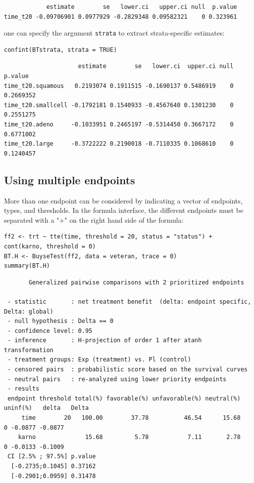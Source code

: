 \documentclass[12pt]{article}
\begin{document}
\begin{verbatim}
            estimate        se   lower.ci   upper.ci null  p.value
time_t20 -0.09706901 0.0977929 -0.2829348 0.09582321    0 0.323961
\end{verbatim}


one can specify the argument \texttt{strata} to extract strata-specific estimates:
\lstset{language=r,label= ,caption= ,captionpos=b,numbers=none}
\begin{lstlisting}
confint(BTstrata, strata = TRUE)
\end{lstlisting}

\begin{verbatim}
                     estimate        se   lower.ci  upper.ci null   p.value
time_t20.squamous   0.2193074 0.1911515 -0.1690137 0.5486919    0 0.2669352
time_t20.smallcell -0.1792181 0.1540933 -0.4567640 0.1301230    0 0.2551275
time_t20.adeno     -0.1033951 0.2465197 -0.5314450 0.3667172    0 0.6771002
time_t20.large     -0.3722222 0.2190018 -0.7110335 0.1068610    0 0.1240457
\end{verbatim}


\clearpage

\subsection{Using multiple endpoints}
\label{sec:org92293c4}
More than one endpoint can be considered by indicating a vector of
endpoints, types, and thresholds. In the formula interface, the
different endpoints must be separated with a "+" on the right hand
side of the formula:
\lstset{language=r,label= ,caption= ,captionpos=b,numbers=none}
\begin{lstlisting}
ff2 <- trt ~ tte(time, threshold = 20, status = "status") + cont(karno, threshold = 0)
BT.H <- BuyseTest(ff2, data = veteran, trace = 0)
summary(BT.H)
\end{lstlisting}

\begin{verbatim}
       Generalized pairwise comparisons with 2 prioritized endpoints

 - statistic       : net treatment benefit  (delta: endpoint specific, Delta: global) 
 - null hypothesis : Delta == 0 
 - confidence level: 0.95 
 - inference       : H-projection of order 1 after atanh transformation 
 - treatment groups: Exp (treatment) vs. Pl (control) 
 - censored pairs  : probabilistic score based on the survival curves
 - neutral pairs   : re-analyzed using lower priority endpoints
 - results
 endpoint threshold total(%) favorable(%) unfavorable(%) neutral(%) uninf(%)   delta   Delta
     time        20   100.00        37.78          46.54      15.68        0 -0.0877 -0.0877
    karno              15.68         5.78           7.11       2.78        0 -0.0133 -0.1009
 CI [2.5% ; 97.5%] p.value 
  [-0.2735;0.1045] 0.37162 
  [-0.2901;0.0959] 0.31478
\end{verbatim}
\end{document}
